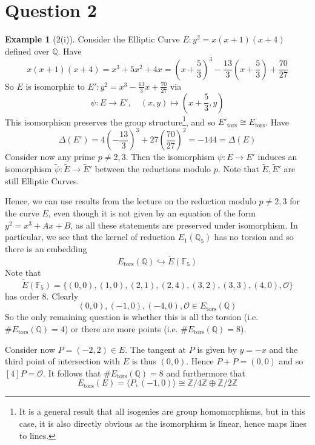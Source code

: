 \documentclass{scrartcl}
\newcommand{\Z}{\mathbb{Z}}
\newcommand{\F}{\mathbb{F}}
\newcommand{\Q}{\mathbb{Q}}
\renewcommand{\O}{\mathcal{O}}
\theoremstyle{definition}
\newtheorem{example}[prop]{Example}
\begin{document}
\section{Question 2}
\begin{example}[2(i)]
    Consider the Elliptic Curve $E: y^2 = x(x + 1)(x + 4)$ defined over $\Q$.
    Have
    \begin{equation*}
        x(x + 1)(x + 4) = x^3 + 5x^2 + 4x = \left( x + \frac 5 3 \right)^3 - \frac {13} 3 \left( x + \frac 5 3 \right) + \frac {70} {27}
    \end{equation*}
    So $E$ is isomorphic to $E': y^2 = x^3 - \frac {13} 3 x + \frac {70} {27}$ via
    \begin{equation*}
        \psi: E \to E', \quad (x, y) \mapsto \left( x + \frac 5 3, y \right)
    \end{equation*}
    This isomorphism preserves the group structure\footnote{It is a general result that all isogenies are group homomorphisms, but in this case, it is also directly obvious as the isomorphism is linear, hence maps lines to lines.}, and so $E'_{\mathrm{tors}} \cong E_{\mathrm{tors}}$.
    Have
    \begin{equation*}
        \Delta(E') = 4 \left( -\frac {13} 3 \right)^3 + 27 \left( \frac {70} {27} \right)^2 = -144 = \Delta(E)
    \end{equation*}
    Consider now any prime $p \neq 2, 3$.
    Then the isomorphism $\psi: E \to E'$ induces an isomorphism $\tilde{\psi}: \tilde{E} \to \tilde{E}'$ between the reductions modulo $p$.
    Note that $\tilde{E}, \tilde{E}'$ are still Elliptic Curves.

    Hence, we can use results from the lecture on the reduction modulo $p \neq 2, 3$ for the curve $E$, even though it is not given by an equation of the form $y^2 = x^3 + Ax + B$, as all these statements are preserved under isomorphism.
    In particular, we see that the kernel of reduction $E_1(\Q_5)$ has no torsion and so there is an embedding
    \begin{equation*}
        E_{\mathrm{tors}}(\Q) \hookrightarrow \tilde{E}(\F_5)
    \end{equation*}
    Note that
    \begin{equation*}
        \tilde{E}(\F_5) = \{ (0, 0), (1, 0), (2, 1), (2, 4), (3, 2), (3, 3), (4, 0), \O \}
    \end{equation*}
    has order 8.
    Clearly
    \begin{equation*}
        (0, 0), (-1, 0), (-4, 0), \O \in E_{\mathrm{tors}}(\Q)
    \end{equation*}
    So the only remaining question is whether this is all the torsion (i.e. $\#E_{\mathrm{tors}}(\Q) = 4$) or there are more points (i.e. $\#E_{\mathrm{tors}}(\Q) = 8$).

    Consider now $P = (-2, 2) \in E$.
    The tangent at $P$ is given by $y = -x$ and the third point of intersection with $E$ is thus $(0, 0)$.
    Hence $P + P = (0, 0)$ and so $[4]P = \O$.
    It follows that $\#E_{\mathrm{tors}}(\Q) = 8$ and furthermore that 
    \begin{equation*}
        E_{\mathrm{tors}}(E) = \langle P, (-1, 0) \rangle \cong \Z/4\Z \oplus \Z/2\Z
    \end{equation*}
\end{example}
\end{document}
